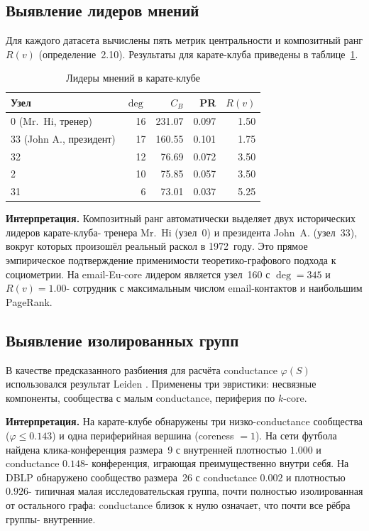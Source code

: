 \documentclass[14pt,a4paper]{extarticle}
\begin{document}
\subsection{Выявление лидеров мнений}

Для каждого датасета вычислены пять метрик центральности и композитный ранг $R(v)$ (определение~2.10). Результаты для карате-клуба приведены в таблице~\ref{tab:leaders}.

\begin{table}[h]
\centering
\begin{tabular}{lrrrr}
\toprule
Узел & $\deg$ & $C_B$ & PR & $R(v)$ \\
\midrule
0 (Mr.\ Hi, тренер) & 16 & 231.07 & 0.097 & 1.50 \\
33 (John A., президент) & 17 & 160.55 & 0.101 & 1.75 \\
32 & 12 & 76.69 & 0.072 & 3.50 \\
2 & 10 & 75.85 & 0.057 & 3.50 \\
31 & 6 & 73.01 & 0.037 & 5.25 \\
\bottomrule
\end{tabular}
\caption{Лидеры мнений в карате-клубе \cite{zachary1977}}
\label{tab:leaders}
\end{table}

\textbf{Интерпретация.} Композитный ранг автоматически выделяет двух исторических лидеров карате-клуба- тренера Mr.\ Hi (узел~0) и президента John~A. (узел~33), вокруг которых произошёл реальный раскол в 1972~году. Это прямое эмпирическое подтверждение применимости теоретико-графового подхода к социометрии. На email-Eu-core лидером является узел~160 с $\deg = 345$ и $R(v) = 1.00$- сотрудник с максимальным числом email-контактов и наибольшим PageRank.

\subsection{Выявление изолированных групп}

В качестве предсказанного разбиения для расчёта conductance $\varphi(S)$ использовался результат Leiden \cite{traag2019}. Применены три эвристики: несвязные компоненты, сообщества с малым conductance, периферия по $k$-core.

\textbf{Интерпретация.} На карате-клубе обнаружены три низко-conductance сообщества ($\varphi \leq 0.143$) и одна периферийная вершина (coreness $= 1$). На сети футбола найдена клика-конференция размера~9 с внутренней плотностью $1.000$ и conductance $0.148$- конференция, играющая преимущественно внутри себя. На DBLP обнаружено сообщество размера~26 с conductance $0.002$ и плотностью $0.926$- типичная малая исследовательская группа, почти полностью изолированная от остального графа: conductance близок к нулю означает, что почти все рёбра группы- внутренние.
\end{document}
